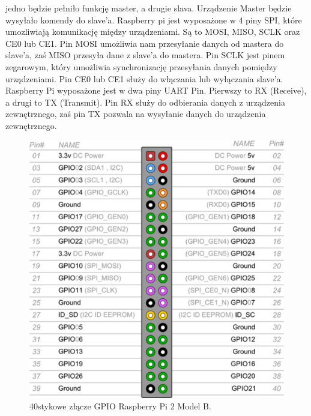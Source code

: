 jedno będzie pełniło funkcję master, a drugie slava. Urządzenie Master będzie wysyłało komendy do slave’a. Raspberry pi jest wyposażone w 4 piny SPI, które umozliwiają komunikację między urządzeniami. Są to MOSI, MISO, SCLK oraz CE0 lub CE1. Pin MOSI umożliwia nam przesyłanie danych od mastera do slave’a, zaś MISO przesyła dane z slave’a do mastera. Pin SCLK jest pinem zegarowym, który umożliwia synchronizację przesyłania danych pomiędzy urządzeniami. Pin CE0 lub CE1 służy do włączania lub wyłączania slave’a. Raspberry Pi wyposażone jest w dwa piny UART Pin. Pierwszy to RX (Receive), a drugi to TX (Transmit). Pin RX służy do odbierania danych z urządzenia zewnętrznego, zaś pin TX pozwala na wysyłanie danych do urządzenia zewnętrznego. 
\begin{figure}[htbp]
	\centering
	\includegraphics[width=0.5\linewidth]{"obrazy/GPIO"}
	\caption{40stykowe złącze GPIO Raspberry Pi 2 Model B.}
	\label{fig:2}
\end{figure}
\newpage
